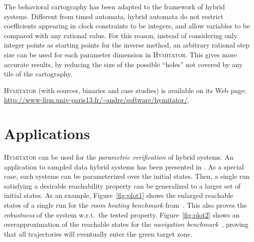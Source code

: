 \documentclass{llncs}
\newcommand{\hymitator}{\textsc{Hymitator}}
\newcommand{\commentaire}[1]{}
\begin{document}

The behavioral cartography has been adapted to the framework of hybrid systems.
Different  from timed automata, hybrid automata do not restrict coefficients appearing in clock constraints to be integers, and allow variables to be compared with any rational value.
For this reason, instead of considering only integer points as starting points for the inverse method, an arbitrary rational step size can be used for each parameter dimension in \hymitator{}.
This gives more accurate results, by reducing the size of the possible ``holes'' not covered by any tile of the cartography.

\hymitator{} (with sources, binaries and case studies) is available on its Web page: \url{http://www-lipn.univ-paris13.fr/~andre/software/hymitator/}.



\section{Applications}



\hymitator{} can be used for the \emph{parametric verification} of hybrid systems. An application to sampled data hybrid systems has been presented in \cite{FK11}. As a special case, such systems can be parameterized over the initial states. Then, a single run satisfying a desirable reachability property can be generalized to a larger set of initial states. As an example, Figure~\ref{fig:plot1} shows the enlarged reachable states of a single run for the \emph{room   heating benchmark} from~\cite{FI2004}.
This also proves the \emph{robustness} of the system w.r.t.~the tested property. Figure~\ref{fig:plot2} shows an overapproximation of the reachable states for the \emph{navigation benchmark}~\cite{FI2004}, proving that all trajectories will eventually enter the green target zone.

% 
\end{document}
